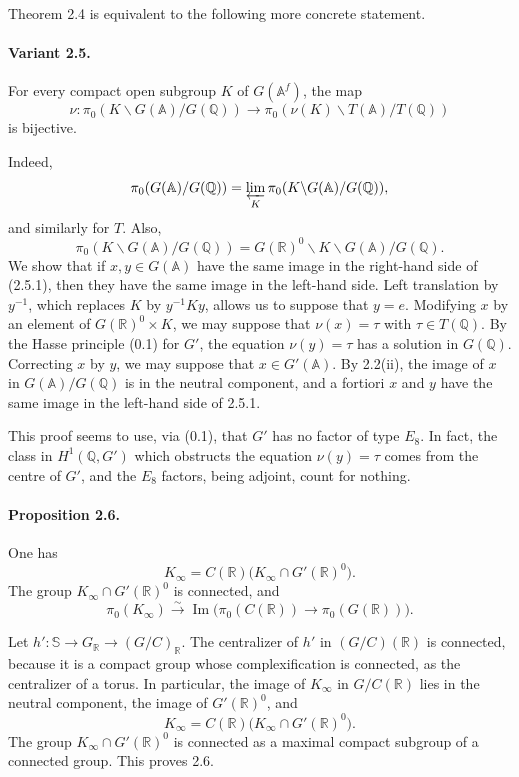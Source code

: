 \documentclass[10pt]{article}
\newcommand{\A}{\mathbb A}
\newcommand{\Af}{\mathbb A^f}
\newcommand{\Q}{\mathbb Q}
\newcommand{\R}{\mathbb R}
\newcommand{\bS}{\mathbb S}
\newcommand{\limproj}{\varprojlim}
\begin{document}
Theorem 2.4 is equivalent to the following more concrete statement.

\paragraph{Variant 2.5.} For every compact open subgroup $K$ of $G(\Af)$, the map
\[
\nu:\pi_0(K\backslash G(\A)/G(\Q))\longrightarrow\pi_0(\nu(K)\backslash T(\A)/T(\Q)) \tag{2.5.1}
\]
is bijective.

Indeed,
\[
\pi_0(G(\A)/G(\Q))=\limproj_K\pi_0(K\backslash G(\A)/G(\Q)),
\]
and similarly for $T$. Also,
\[
\pi_0(K\backslash G(\A)/G(\Q))=G(\R)^0\backslash K\backslash G(\A)/G(\Q).
\]
We show that if $x,y\in G(\A)$ have the same image in the right-hand side of (2.5.1), then they have the same image in the left-hand side. Left translation by $y^{-1}$, which replaces $K$ by $y^{-1}Ky$, allows us to suppose that $y=e$. Modifying $x$ by an element of $G(\R)^0\times K$, we may suppose that $\nu(x)=\tau$ with $\tau\in T(\Q)$. By the Hasse principle (0.1) for $G'$, the equation $\nu(y)=\tau$ has a solution in $G(\Q)$. Correcting $x$ by $y$, we may suppose that $x\in G'(\A)$. By 2.2(ii), the image of $x$ in $G(\A)/G(\Q)$ is in the neutral component, and a fortiori $x$ and $y$ have the same image in the left-hand side of 2.5.1.

This proof seems to use, via (0.1), that $G'$ has no factor of type $E_8$. In fact, the class in $H^1(\Q,G')$ which obstructs the equation $\nu(y)=\tau$ comes from the centre of $G'$, and the $E_8$ factors, being adjoint, count for nothing.

\paragraph{Proposition 2.6.} One has
\[
K_\infty=C(\R)\bigl(K_\infty\cap G'(\R)^0\bigr).
\]
The group $K_\infty\cap G'(\R)^0$ is connected, and
\[
\pi_0(K_\infty)\xrightarrow{\sim}\operatorname{Im}\bigl(\pi_0(C(\R))\longrightarrow\pi_0(G(\R))\bigr).
\]

Let $h':\bS\to G_\R\to(G/C)_\R$. The centralizer of $h'$ in $(G/C)(\R)$ is connected, because it is a compact group whose complexification is connected, as the centralizer of a torus. In particular, the image of $K_\infty$ in $G/C(\R)$ lies in the neutral component, the image of $G'(\R)^0$, and
\[
K_\infty=C(\R)\bigl(K_\infty\cap G'(\R)^0\bigr).
\]
The group $K_\infty\cap G'(\R)^0$ is connected as a maximal compact subgroup of a connected group. This proves 2.6.
\end{document}
